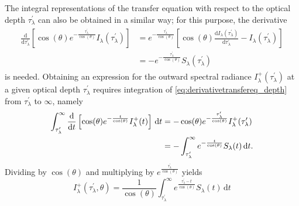 \documentclass[a4paper,11pt]{report}
\def\fc#1{{\color{black}{#1}}} %
\begin{document}
The integral representations of the transfer equation with respect to the optical depth $\tau^\prime_\lambda$ can also be obtained in a similar way; for this purpose, the derivative \begin{align}\begin{aligned}\label{eq:derivativetransfereq_depth}
\frac{\mathrm{d}}{\mathrm{d}\tau^\prime_\lambda}\left[\cos(\theta)e^{-\frac{\tau^\prime_\lambda}{\cos(\theta)}}I_\lambda(\tau^\prime_\lambda)\right] &= e^{-\frac{\tau^\prime_\lambda}{\cos(\theta)}}\left[\cos(\theta)\frac{\mathrm{d}I_\lambda(\tau^\prime_\lambda)}{\mathrm{d}\tau^\prime_\lambda}-I_\lambda(\tau^\prime_\lambda)\right] \\ &= -e^{-\frac{\tau^\prime_\lambda}{\cos(\theta)}}S_\lambda(\tau^\prime_\lambda)
\end{aligned}\end{align} is needed. Obtaining an expression for the outward spectral radiance $I^+_\lambda(\tau_\lambda^\prime)$ at a given optical depth $\tau^\prime_\lambda$ requires integration of \cref{eq:derivativetransfereq_depth} from $\tau_\lambda^\prime$ to $\infty$, namely \begin{align}\begin{aligned}
\int_{\tau_\lambda^\prime}^{\infty} \frac{\mathrm{d}}{\mathrm{d}t}\left[\cos(\theta)e^{\fc{-}\frac{t}{\cos(\theta)}}I^+_\lambda(t)\right]\,\mathrm{d}t &= -\cos(\theta)e^{-\frac{\tau_\lambda^\prime}{\cos(\theta)}}I_\lambda^+(\tau_\lambda^\prime) \\ &= -\int_{\tau^\prime_\lambda}^{\infty} e^{-\frac{t}{\cos(\theta)}}S_\lambda(t)\,\mathrm{d}t.
\end{aligned}\end{align} Dividing by $\cos(\theta)$ and multiplying by $e^{\frac{\tau_\lambda^\prime}{\cos(\theta)}}$ yields 
\begin{equation}\label{eq:formaltransferequationoutward_depth}
I^+_\lambda(\tau^\prime_\lambda, \theta) = \frac{1}{\cos(\theta)}\int_{\tau^\prime_\lambda}^{\infty} e^{\frac{\tau_\lambda^\prime - t}{\cos(\theta)}}S_\lambda(t)\,\mathrm{d}t
\end{equation}
\end{document}
